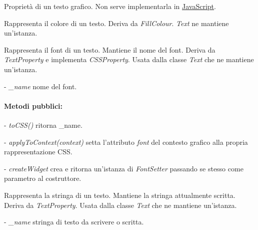 Propriet\`a di un testo grafico. Non serve implementarla in \underline{JavaScript}.

Rappresenta il colore di un testo.
Deriva da \textit{FillColour}.
\textit{Text} ne mantiene un'istanza.

Rappresenta il font di un testo. Mantiene il nome del font.
Deriva da \textit{TextProperty} e implementa \textit{CSSProperty}.
Usata dalla classe \textit{Text} che ne mantiene un'istanza.
\begin{elencopuntato}[\subsubsecindent]
\item[-] \textit{{\_}name} nome del font.
\end{elencopuntato}
\paragraph{Metodi pubblici:}
\begin{elencopuntato}[\subsubsecindent]
\item[-] \textit{toCSS()} ritorna {\_}name.
\item[-] \textit{applyToContext(context)} setta l'attributo \textit{font} del contesto grafico alla propria rappresentazione CSS.
\item[-] \textit{createWidget} crea e ritorna un'istanza di \textit{FontSetter} passando se stesso come parametro al costruttore.
\end{elencopuntato}

Rappresenta la stringa di un testo. Mantiene la stringa attualmente scritta.
Deriva da \textit{TextProperty}.
Usata dalla classe \textit{Text} che ne mantiene un'istanza.
\begin{elencopuntato}[\subsubsecindent]
\item[-] \textit{{\_}name} stringa di testo da scrivere o scritta.
\end{elencopuntato}
